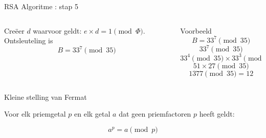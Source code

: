 \documentclass{beamer}
\begin{document}
\begin{frame}{RSA Algoritme : stap 5}
	\begin{columns}
		\begin{column}[T]{0.5\textwidth}
			Cre\"eer $d$ waarvoor geldt:  $e \times d = 1 \pmod{\Phi}$.
			Ontsleuteling is \[ B = 33^7 \pmod{35}  \]	
	\end{column}
		\begin{column}[T]{0.5\textwidth}
			Voorbeeld
			\[ B = 33^7 \pmod{35} \]
			\[ 33^7 \pmod{35} \]
			\[  33^4 \pmod{35} \times 33^3 \pmod{35} \]
			\[ 51 \times 27 \pmod{35} \]
			\[ 1377 \pmod{35} = 12 \]
		\end{column}
	\end{columns}	
\end{frame}

\begin{frame}{Kleine stelling van Fermat}
	
	Voor elk priemgetal $p$ en elk getal $a$ dat geen priemfactoren $p$ heeft geldt:  
	
	\[ a^p  = a \pmod{p} \]
	
\end{frame}






\end{document}
